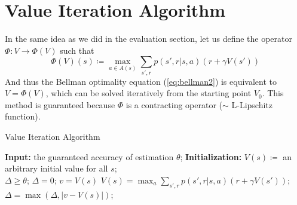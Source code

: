 \documentclass[12pt, openany]{report}
\theoremstyle{definition}
\begin{document}
\section{Value Iteration Algorithm}
In the same idea as we did in the evaluation section, let us define the operator $\Phi:V\to \Phi(V)$ such that 
\begin{equation}
	\Phi(V)(s) \coloneqq \max_{a\in A(s)} \sum_{s',r}p(s',r|s,a)(r+\gamma V(s'))
\end{equation}
And thus the Bellman optimality equation (\eqref{eq:bellman2}) is equivalent to $V=\Phi(V)$, which can be solved iteratively from the starting point $V_0$. This method is guaranteed because $\Phi$ is a contracting operator ($\sim$ L-Lipschitz function). 
\begin{algorithm}
	\caption{Value Iteration Algorithm}
	\begin{algorithmic}[1]
		\State \textbf{Input: } the guaranteed accuracy of estimation $\theta$;
		\State \textbf{Initialization: } $V(s)\coloneqq$ an arbitrary initial value for all $s$;\\ 
		\quad \qquad \qquad \qquad $\Delta \ge \theta$;
		\While {$\Delta \ge \theta$}
		\State $\Delta = 0$;
		\State $v=V(s)$
		\State $V(s) = \max_a \sum_{s',r}p(s',r|s,a)(r+\gamma V(s'))$;
		\State $\Delta = \max (\Delta, |v-V(s)|)$;
		\EndFor
		\EndWhile
	\end{algorithmic}
\end{algorithm}
\end{document}
